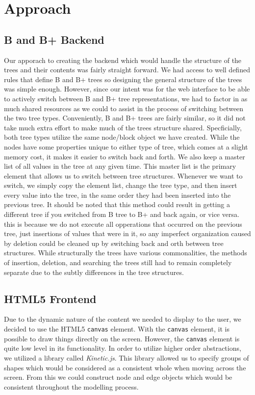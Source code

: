 \section{Approach}

\subsection{B and B+ Backend}
Our apporach to creating the backend which would handle the structure
of the trees and their contents was fairly straight forward.  We had
access to well defined rules that define B and B+ trees so designing
the general structure of the trees was simple enough.  However, since
our intent was for the web interface to be able to actively switch
between B and B+ tree representations, we had to factor in as much
shared resources as we could to assist in the process of switching
between the two tree types.  Conveniently, B and B+ trees are fairly
similar, so it did not take much extra effort to make much of the
trees structure shared.  Specficially, both tree types utilize the
same node/block object we have created.  While the nodes have some
properties unique to either type of tree, which comes at a slight
memory cost, it makes it easier to switch back and forth.  We also
keep a master list of all values in the tree at any given time.  This
master list is the primary element that allows us to switch between
tree structures.  Whenever we want to switch, we simply copy the
element list, change the tree type, and then insert every value into
the tree, in the same order they had been inserted into the previous
tree.  It should be noted that this method could result in getting a
different tree if you switched from B tree to B+ and back again, or
vice versa.  this is because we do not execute all opperations that
occurred on the previous tree, just insertions of values that were in
it, so any imperfect organization caused by deletion could be cleaned
up by switching back and orth between tree structures.  While
structurally the trees have various commonalities, the methods of
insertion, deletion, and searching the trees still had to remain
completely separate due to the subtly differences in the tree
structures.

\subsection{HTML5 Frontend}
Due to the dynamic nature of the content we needed to display to the
user, we decided to use the HTML5 \texttt{canvas} element. With the
\texttt{canvas} element, it is possible to draw things directly on the
screen. However, the \texttt{canvas} element is quite low level in
its functionality. In order to utilize higher order abstractions, we
utilized a library called \textit{Kinetic.js}. This library allowed us
to specify groups of shapes which would be considered as a consistent
whole when moving across the screen. From this we could construct node
and edge objects which would be consistent throughout the modelling
process.

